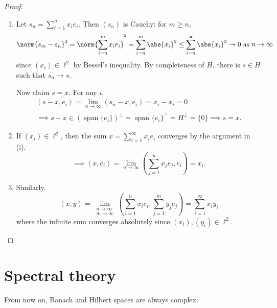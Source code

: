 \documentclass{article}
\DeclareMathOperator{\spn}{span}
\begin{document}
\begin{proof}
    \leavevmode
    \begin{enumerate}[label=(\roman*)]
        \item Let $s_n = \sum_{i=1}^n x_i e_i$. Then $(s_n)$ is Cauchy: for $m \geq n$,
            \begin{equation*}
                \norm{s_m - s_n}^2 = \norm{\sum_{i=n}^m x_i e_i}^2 = \sum_{i=n}^m \abs{x_i}^2 \leq \sum_{i=n}^\infty \abs{x_i}^2 \to 0 \text{ as } n \to \infty
            \end{equation*}
            since $(x_i) \in \ell^2$ by Bessel's inequality. By completeness of $H$, there is $s \in H$ such that $s_n \to s$.

            Now claim $s = x$.
            For any $i$,
            \begin{gather*}
                (s-x, e_i) = \lim_{n \to \infty} (s_n - x, e_i) = x_i - x_i = 0 \\
                \implies s-x \in (\spn \{e_i\})^\bot = \overline{\spn \{e_i\}}^\bot = H^\bot = \{0\} \implies s = x.
            \end{gather*}
        \item If $(x_i) \in \ell^2$, then the sum $x = \sum_{i=1}^\infty x_i e_i$ converges by the argument in (i).
            \begin{equation*}
                \implies (x, e_i) = \lim_{n \to \infty} \left(\sum_{j=1}^n x_j e_j, e_i\right) = x_i.
            \end{equation*}
        \item Similarly.
            \begin{equation*}
            (x, y) = \lim_{\substack{n \to \infty \\ m \to \infty}} \left(\sum_{i=1}^n x_i e_i, \sum_{j=1}^m y_j e_j\right) = \sum_{i=1}^\infty x_i \overline{y_i}
            \end{equation*}
            where the infinite sum converges absolutely since $(x_i), (y_i) \in \ell^2$. \qedhere
    \end{enumerate}
\end{proof}

\clearpage
\section{Spectral theory}
From now on, Banach and Hilbert spaces are always complex.
\end{document}

